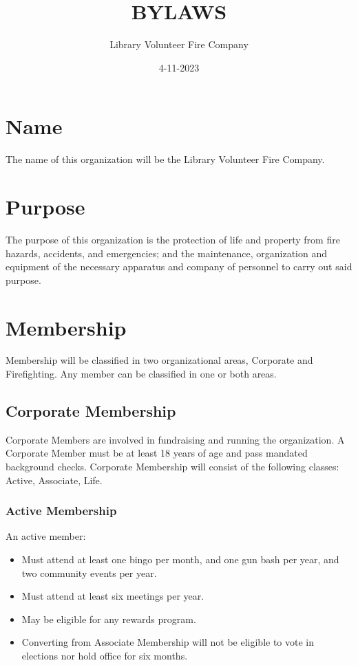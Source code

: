 ﻿\documentclass[12pt,letterpaper]{article}
\title{BYLAWS}
\author{Library Volunteer Fire Company}
\date{4-11-2023}
\begin{document}
\maketitle
\newpage
\tableofcontents
\newpage

\section{Name}
The name of this organization will be the Library Volunteer Fire Company.

\section{Purpose}
The purpose of this organization is the protection of life and property from fire hazards, accidents, and emergencies; and the maintenance, organization and equipment of the necessary apparatus and company of personnel to carry out said purpose.

\section{Membership}
Membership will be classified in two organizational areas, Corporate and Firefighting.  Any member can be classified in one or both areas.

\subsection{Corporate Membership}
Corporate Members are involved in fundraising and running the organization.  A Corporate Member must be at least 18 years of age and pass mandated background checks.  Corporate Membership will consist of the following classes: Active, Associate, Life.

\subsubsection{Active Membership}
An active member:
\begin{itemize}
\item Must attend at least one bingo per month, and one gun bash per year, and two community events per year.
\item Must attend at least six meetings per year.
\item May be eligible for any rewards program.
\item Converting from Associate Membership will not be eligible to vote in elections nor hold office for six months.
\end{itemize}
\end{document}
